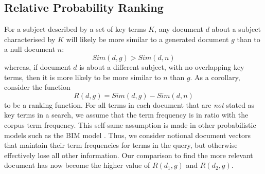 \subsection{Relative Probability Ranking}
For a subject described by a set of key terms $K$, any document $d$ about a subject characterised by $K$ will likely be more similar to a generated document $g$ than to a null document $n$: 
\begin{equation}
 Sim(d, g) > Sim(d, n)
\end{equation}
whereas, if document $d$ is about a different subject, with no overlapping key terms, then it is more likely to be more similar to $n$ than $g$.  As a corollary, consider the function
   \begin{equation}
       R(d,g) = Sim(d, g) -  Sim(d, n)
   \end{equation}
to be a ranking function. 
%
For all terms in each document that are \emph{not} stated as key terms in a search, we assume that the term frequency is in ratio with the corpus term frequency. This self-same assumption is made in other probabilistic models such as the BIM model \cite{zhai:2008}. Thus, we consider notional document vectors that maintain their term frequencies for terms in the query, but otherwise effectively lose all other information. 
Our comparison to find the more relevant document has now become the higher value of $R(d_1, g)$ and $R(d_2, g)$.

